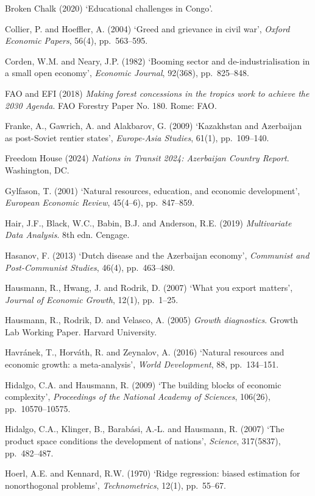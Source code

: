 \documentclass[12pt,a4paper]{report}
\begin{document}
\begin{flushleft}
Broken Chalk (2020) `Educational challenges in Congo'.

Collier, P. and Hoeffler, A. (2004) `Greed and grievance in civil war', \textit{Oxford Economic Papers}, 56(4), pp.~563--595.

Corden, W.M. and Neary, J.P. (1982) `Booming sector and de-industrialisation in a small open economy', \textit{Economic Journal}, 92(368), pp.~825--848.

FAO and EFI (2018) \textit{Making forest concessions in the tropics work to achieve the 2030 Agenda}. FAO Forestry Paper No. 180. Rome: FAO.

Franke, A., Gawrich, A. and Alakbarov, G. (2009) `Kazakhstan and Azerbaijan as post-Soviet rentier states', \textit{Europe-Asia Studies}, 61(1), pp.~109--140.

Freedom House (2024) \textit{Nations in Transit 2024: Azerbaijan Country Report}. Washington, DC.

Gylfason, T. (2001) `Natural resources, education, and economic development', \textit{European Economic Review}, 45(4--6), pp.~847--859.

Hair, J.F., Black, W.C., Babin, B.J. and Anderson, R.E. (2019) \textit{Multivariate Data Analysis}. 8th edn. Cengage.

Hasanov, F. (2013) `Dutch disease and the Azerbaijan economy', \textit{Communist and Post-Communist Studies}, 46(4), pp.~463--480.

Hausmann, R., Hwang, J. and Rodrik, D. (2007) `What you export matters', \textit{Journal of Economic Growth}, 12(1), pp.~1--25.

Hausmann, R., Rodrik, D. and Velasco, A. (2005) \textit{Growth diagnostics}. Growth Lab Working Paper. Harvard University.

Havr\'{a}nek, T., Horv\'{a}th, R. and Zeynalov, A. (2016) `Natural resources and economic growth: a meta-analysis', \textit{World Development}, 88, pp.~134--151.

Hidalgo, C.A. and Hausmann, R. (2009) `The building blocks of economic complexity', \textit{Proceedings of the National Academy of Sciences}, 106(26), pp.~10570--10575.

Hidalgo, C.A., Klinger, B., Barab\'{a}si, A.-L. and Hausmann, R. (2007) `The product space conditions the development of nations', \textit{Science}, 317(5837), pp.~482--487.

Hoerl, A.E. and Kennard, R.W. (1970) `Ridge regression: biased estimation for nonorthogonal problems', \textit{Technometrics}, 12(1), pp.~55--67.


\end{flushleft}
\end{document}
